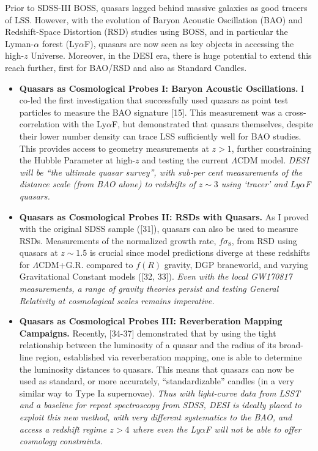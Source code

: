 \documentclass[oneside, a4paper, onecolumn, 11pt]{article}
\begin{document}
\smallskip \smallskip
\noindent 
Prior to SDSS-III BOSS, quasars lagged behind massive galaxies as good
tracers of LSS. However, with the evolution of Baryon Acoustic
Oscillation (BAO) and Redshift-Space Distortion (RSD) studies using
BOSS, and in particular the Lyman-$\alpha$ forest (Ly$\alpha$F),
quasars are now seen as key objects in accessing the high-$z$
Universe. Moreover, in the DESI era, there is huge potential to extend
this reach further, first for BAO/RSD and also as Standard Candles. 


\begin{itemize}
\item{{\bf Quasars as Cosmological Probes {\sc I:} Baryon Acoustic
      Oscillations.} I co-led the first investigation that successfully used
    quasars as point test particles to measure the BAO signature
    [15]. This measurement was a cross-correlation with the Ly$\alpha$F,
    but demonstrated that quasars themselves, despite their lower number
    density can trace LSS sufficiently well for BAO studies. This
    provides access to geometry measurements at $z>1$, further
    constraining the Hubble Parameter at high-$z$ and testing the current
    $\Lambda$CDM model.  {\it DESI will be ``the ultimate quasar survey'',
      with sub-per cent measurements of the distance scale (from BAO alone)
      to redshifts of $z\sim3$ using `tracer' and Ly$\alpha$F quasars.}}
  
\item{{\bf Quasars as Cosmological Probes {\sc II:} RSDs with
      Quasars.}  As I proved with the original SDSS sample ([31]), quasars
    can also be used to measure RSDs.  Measurements of the normalized
    growth rate, $f\sigma_{8}$, from RSD using quasars at $z\sim1.5$ is
    crucial since model predictions diverge at these redshifts for
    $\Lambda$CDM+G.R. compared to $f(R)$ gravity, DGP braneworld, and varying
    Gravitational Constant models ([32, 33]). {\it Even with the local
      GW170817 measurements, a range of gravity theories persist and
      testing General Relativity at cosmological scales remains imperative.}}
  
\item{{\bf Quasars as Cosmological Probes {\sc III:} Reverberation
      Mapping Campaigns.}  Recently, [34-37] demonstrated that by using the
    tight relationship between the luminosity of a quasar and the radius
    of its broad-line region, established via reverberation mapping, one
    is able to determine the luminosity distances to quasars.  This means
    that quasars can now be used as standard, or more accurately,
    ``standardizable'' candles (in a very similar way to Type Ia
    supernovae). {\it Thus with light-curve data from LSST and a baseline
      for repeat spectroscopy from SDSS, DESI is ideally placed to exploit
      this new method, with very different systematics to the BAO, and
      access a redshift regime $z>4$ where even the Ly$\alpha$F will not be
      able to offer cosmology constraints.}}

\end{itemize}
\end{document}
